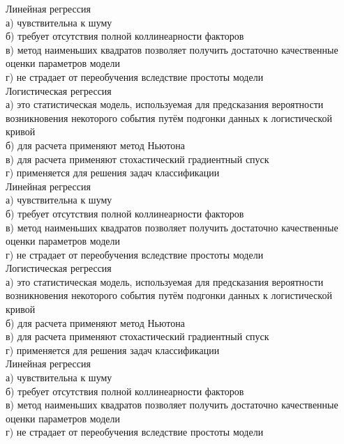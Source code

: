 \documentclass[10pt,a4paper]{article}
\author{Nikolay Anokhin}
\begin{document}
\thispagestyle{empty}

\noindent Линейная регрессия \\
а) чувствительна к шуму \\
б) требует отсутствия полной коллинеарности факторов \\
в) метод наименьших квадратов позволяет получить достаточно качественные оценки параметров модели \\
г) не страдает от переобучения вследствие простоты модели \\

\noindent Логистическая регрессия \\
а) это статистическая модель, используемая для предсказания вероятности возникновения некоторого события путём подгонки данных к логистической кривой \\
б) для расчета применяют метод Ньютона \\
в) для расчета применяют стохастический градиентный спуск \\
г) применяется для решения задач классификации \\

\vspace{1em}
\noindent Линейная регрессия \\
а) чувствительна к шуму \\
б) требует отсутствия полной коллинеарности факторов \\
в) метод наименьших квадратов позволяет получить достаточно качественные оценки параметров модели \\
г) не страдает от переобучения вследствие простоты модели \\

\noindent Логистическая регрессия \\
а) это статистическая модель, используемая для предсказания вероятности возникновения некоторого события путём подгонки данных к логистической кривой \\
б) для расчета применяют метод Ньютона \\
в) для расчета применяют стохастический градиентный спуск \\
г) применяется для решения задач классификации \\

\vspace{1em}
\noindent Линейная регрессия \\
а) чувствительна к шуму \\
б) требует отсутствия полной коллинеарности факторов \\
в) метод наименьших квадратов позволяет получить достаточно качественные оценки параметров модели \\
г) не страдает от переобучения вследствие простоты модели \\
\end{document}
